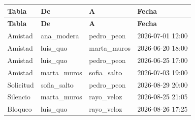 \begin{center}\footnotesize\setlength{\tabcolsep}{2pt}
\begin{longtable}{|L{82.9pt}|L{110.4pt}|L{110.4pt}|L{149.7pt}|}
\hline
\textbf{\hspace{0pt}Tabla} & \textbf{\hspace{0pt}De} & \textbf{\hspace{0pt}A} & \textbf{\hspace{0pt}Fecha} \\ \hline
\endfirsthead
\hline
\textbf{\hspace{0pt}Tabla} & \textbf{\hspace{0pt}De} & \textbf{\hspace{0pt}A} & \textbf{\hspace{0pt}Fecha} \\ \hline
\endhead
Amistad & ana\_\allowbreak{}modera & pedro\_\allowbreak{}peon & 2026-07-01 12:00 \\ \hline
Amistad & luis\_\allowbreak{}quo & marta\_\allowbreak{}muros & 2026-06-20 18:00 \\ \hline
Amistad & luis\_\allowbreak{}quo & pedro\_\allowbreak{}peon & 2026-06-25 17:00 \\ \hline
Amistad & marta\_\allowbreak{}muros & sofia\_\allowbreak{}salto & 2026-07-03 19:00 \\ \hline
Solicitud & sofia\_\allowbreak{}salto & pedro\_\allowbreak{}peon & 2026-08-29 20:00 \\ \hline
Silencio & marta\_\allowbreak{}muros & rayo\_\allowbreak{}veloz & 2026-08-25 21:05 \\ \hline
Bloqueo & luis\_\allowbreak{}quo & rayo\_\allowbreak{}veloz & 2026-08-26 17:25 \\ \hline
\end{longtable}
\end{center}

